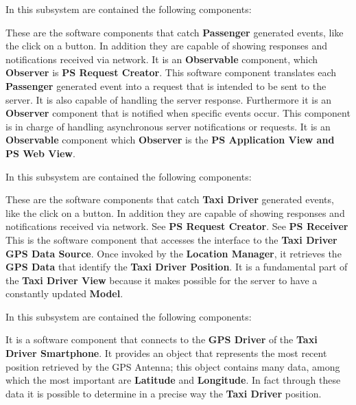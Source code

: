 \begin{itemize}
	In this subsystem are contained the following components:
	\begin{itemize}
		 These are the software components that catch \textbf{Passenger} generated events, like the click on a button. In addition they are capable of showing responses and notifications received via network.
		It is an \textbf{Observable} component, which \textbf{Observer} is \textbf{PS Request Creator}.
		 This software component translates each \textbf{Passenger} generated event into a request that is intended to be sent to the server.
		It is also capable of handling the server response.
		Furthermore it is an \textbf{Observer} component that is notified when specific events occur.
		 This component is in charge of handling asynchronous server notifications or requests.
		It is an \textbf{Observable} component which \textbf{Observer} is the \textbf{PS Application View and PS Web View}.
	\end{itemize}
	\itemBold{Taxi Driver View}
	In this subsystem are contained the following components:
	\begin{itemize}
		 These are the software components that catch \textbf{Taxi Driver} generated events, like the click on a button. In addition they are capable of showing responses and notifications received via network.
		 See \textbf{PS Request Creator}.
		 See \textbf{PS Receiver}
		 This is the software component that accesses the interface to the \textbf{Taxi Driver GPS Data Source}. Once invoked by the \textbf{Location Manager}, it retrieves the \textbf{GPS Data} that identify the \textbf{Taxi Driver Position}. It is a fundamental part of the \textbf{Taxi Driver View} because it makes possible for the server to have a constantly updated \textbf{Model}.
	\end{itemize}	
	\itemBold{Taxi Driver Model}
	In this subsystem are contained the following components:
	\begin{itemize}
		 It is a software component that connects to the \textbf{GPS Driver} of the \textbf{Taxi Driver Smartphone}.
		It provides an object that represents the most recent position retrieved by the GPS Antenna; this object contains many data, among which the most important are \textbf{Latitude} and \textbf{Longitude}.
		In fact through these data it is possible to determine in a precise way the \textbf{Taxi Driver} position.
	\end{itemize}	
	

\end{itemize}
